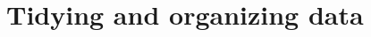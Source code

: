 \documentclass[unknownkeysallowed]{beamer}\usepackage[]{graphicx}\usepackage[]{color}
\begin{document}
 

\section{Tidying and organizing data}

\frame{\sectionpage}

  

\end{document}
